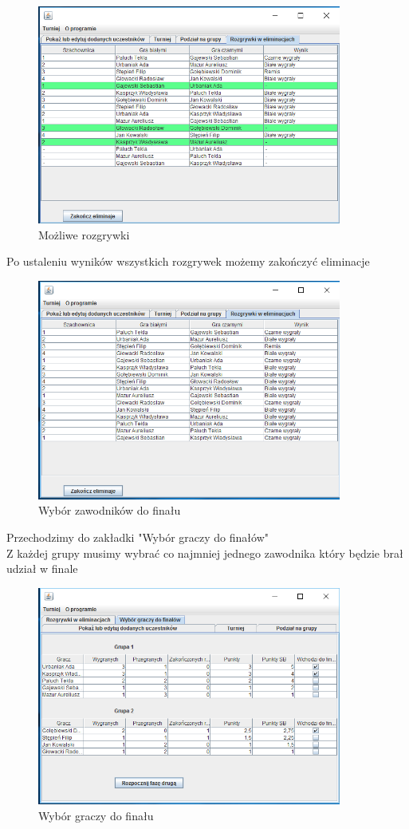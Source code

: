 \begin{figure}[H]
	\centering
	\includegraphics[width=10cm]{fig/13}
	\caption{Możliwe rozgrywki}
	\label {fig:mozliwe_rozgrywki_2} 
\end{figure}
Po ustaleniu wyników wszystkich rozgrywek możemy zakończyć eliminacje
\begin{figure}[H]
	\centering
	\includegraphics[width=10cm]{fig/14}
	\caption{Wybór zawodników do finału}
	\label {fig:wybor_zawodnikow_do_finalu} 
\end{figure}
Przechodzimy do zakładki "Wybór graczy do finałów"\\
Z każdej grupy musimy wybrać co najmniej jednego zawodnika który będzie brał udział w finale
\begin{figure}[H]
	\centering
	\includegraphics[width=10cm]{fig/15}
	\caption{Wybór graczy do finału}
	\label {fig:rozgrywka_finalowa_1} 
\end{figure}
